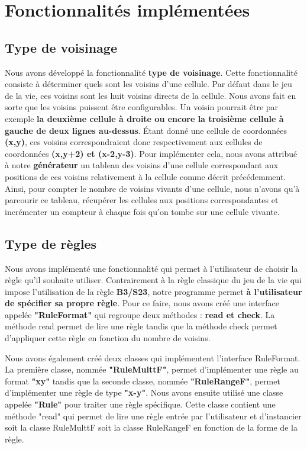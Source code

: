 \section{Fonctionnalités implémentées}
\subsection{Type de voisinage}
Nous avons développé la fonctionnalité \textbf{type de voisinage}. Cette fonctionnalité consiste à
déterminer quels sont les voisins d’une cellule. Par défaut dans le jeu de la vie, ces voisins
sont les huit voisins directs de la cellule. Nous avons fait en sorte que les voisins puissent
être configurables. Un voisin pourrait être par exemple \textbf{la deuxième cellule à droite ou
encore la troisième cellule à gauche de deux lignes au-dessus}. Étant donné une cellule
de coordonnées \textbf{(x,y)}, ces voisins correspondraient donc respectivement aux cellules de
coordonnées \textbf{(x,y+2) et (x-2,y-3)}. Pour implémenter cela, nous avons attribué à notre
\textbf{générateur} un tableau des voisins d’une cellule correspondant aux positions de ces voisins
relativement à la cellule comme décrit précédemment. Ainsi, pour compter le nombre de
voisins vivants d’une cellule, nous n’avons qu’à parcourir ce tableau, récupérer les cellules
aux positions correspondantes et incrémenter un compteur à chaque fois qu’on tombe sur une cellule vivante.
\subsection{Type de règles}
Nous avons implémenté une fonctionnalité qui permet à l'utilisateur de choisir la règle qu'il souhaite utiliser. Contrairement à la règle classique du jeu de la vie qui impose l'utilisation de la règle \textbf{B3/S23}, notre programme permet \textbf{à l'utilisateur de spécifier sa propre règle}. Pour ce faire, nous avons créé une interface appelée \textbf{"RuleFormat"} qui regroupe deux méthodes : \textbf{read et check}. La méthode read permet de lire une règle tandis que la méthode check permet d'appliquer cette règle en fonction du nombre de voisins.

Nous avons également créé deux classes qui implémentent l'interface RuleFormat. La première classe, nommée \textbf{"RuleMulttF"}, permet d'implémenter une règle au format \textbf{"xy"} tandis que la seconde classe, nommée \textbf{"RuleRangeF"}, permet d'implémenter une règle de type \textbf{"x-y"}. Nous avons ensuite utilisé une classe appelée \textbf{"Rule"} pour traiter une règle spécifique. Cette classe contient une méthode "read" qui permet de lire une règle entrée par l'utilisateur et d'instancier soit la classe RuleMulttF soit la classe RuleRangeF en fonction de la forme de la règle.

